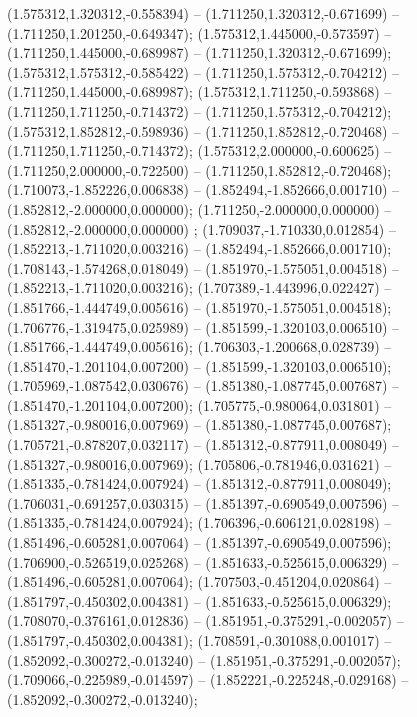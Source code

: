  (1.575312,1.320312,-0.558394) -- (1.711250,1.320312,-0.671699) -- (1.711250,1.201250,-0.649347);
 (1.575312,1.445000,-0.573597) -- (1.711250,1.445000,-0.689987) -- (1.711250,1.320312,-0.671699);
 (1.575312,1.575312,-0.585422) -- (1.711250,1.575312,-0.704212) -- (1.711250,1.445000,-0.689987);
 (1.575312,1.711250,-0.593868) -- (1.711250,1.711250,-0.714372) -- (1.711250,1.575312,-0.704212);
 (1.575312,1.852812,-0.598936) -- (1.711250,1.852812,-0.720468) -- (1.711250,1.711250,-0.714372);
 (1.575312,2.000000,-0.600625) -- (1.711250,2.000000,-0.722500) -- (1.711250,1.852812,-0.720468);
 (1.710073,-1.852226,0.006838) -- (1.852494,-1.852666,0.001710) -- (1.852812,-2.000000,0.000000);
 (1.711250,-2.000000,0.000000) -- (1.852812,-2.000000,0.000000) ;
 (1.709037,-1.710330,0.012854) -- (1.852213,-1.711020,0.003216) -- (1.852494,-1.852666,0.001710);
 (1.708143,-1.574268,0.018049) -- (1.851970,-1.575051,0.004518) -- (1.852213,-1.711020,0.003216);
 (1.707389,-1.443996,0.022427) -- (1.851766,-1.444749,0.005616) -- (1.851970,-1.575051,0.004518);
 (1.706776,-1.319475,0.025989) -- (1.851599,-1.320103,0.006510) -- (1.851766,-1.444749,0.005616);
 (1.706303,-1.200668,0.028739) -- (1.851470,-1.201104,0.007200) -- (1.851599,-1.320103,0.006510);
 (1.705969,-1.087542,0.030676) -- (1.851380,-1.087745,0.007687) -- (1.851470,-1.201104,0.007200);
 (1.705775,-0.980064,0.031801) -- (1.851327,-0.980016,0.007969) -- (1.851380,-1.087745,0.007687);
 (1.705721,-0.878207,0.032117) -- (1.851312,-0.877911,0.008049) -- (1.851327,-0.980016,0.007969);
 (1.705806,-0.781946,0.031621) -- (1.851335,-0.781424,0.007924) -- (1.851312,-0.877911,0.008049);
 (1.706031,-0.691257,0.030315) -- (1.851397,-0.690549,0.007596) -- (1.851335,-0.781424,0.007924);
 (1.706396,-0.606121,0.028198) -- (1.851496,-0.605281,0.007064) -- (1.851397,-0.690549,0.007596);
 (1.706900,-0.526519,0.025268) -- (1.851633,-0.525615,0.006329) -- (1.851496,-0.605281,0.007064);
 (1.707503,-0.451204,0.020864) -- (1.851797,-0.450302,0.004381) -- (1.851633,-0.525615,0.006329);
 (1.708070,-0.376161,0.012836) -- (1.851951,-0.375291,-0.002057) -- (1.851797,-0.450302,0.004381);
 (1.708591,-0.301088,0.001017) -- (1.852092,-0.300272,-0.013240) -- (1.851951,-0.375291,-0.002057);
 (1.709066,-0.225989,-0.014597) -- (1.852221,-0.225248,-0.029168) -- (1.852092,-0.300272,-0.013240);
